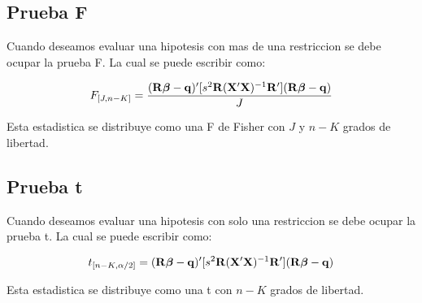 \documentclass[
  a4paper,
]{article}
\begin{document}
\subsection{Prueba F}

Cuando deseamos evaluar una hip\textquotesingle otesis con
m\textquotesingle as de una restricci\textquotesingle on se debe ocupar
la prueba F. La cual se puede escribir como:

\[F_{[J, n-K]} = \frac{({\bf R}{\boldsymbol \beta} - {\bf q})' [s^2 {\bf R} ({\bf X'X})^{-1} {\bf R}'] ({\bf R}{\boldsymbol \beta} - {\bf q})}{J}\]

Esta estad\textquotesingle istica se distribuye como una F de Fisher con
\(J\) y \(n-K\) grados de libertad.

\subsection{Prueba t}

Cuando deseamos evaluar una hip\textquotesingle otesis con solo una
restricci\textquotesingle on se debe ocupar la prueba t. La cual se
puede escribir como:

\[t_{[n-K, \alpha/2]} = ({\bf R}{\boldsymbol \beta} - {\bf q})' [s^2 {\bf R} ({\bf X'X})^{-1} {\bf R}'] ({\bf R}{\boldsymbol \beta} - {\bf q})\]

Esta estad\textquotesingle istica se distribuye como una t con \(n-K\)
grados de libertad.


\printbibliography
\end{document}
